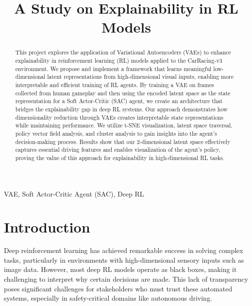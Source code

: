 \documentclass[conference]{IEEEtran}
\begin{document}
\title{A Study on Explainability in RL Models\\
}

\author{
\and
{}
}


\maketitle

\begin{abstract}
This project explores the application of Variational Autoencoders (VAEs) to enhance explainability in reinforcement learning (RL) models applied to the CarRacing-v3 environment. We propose and implement a framework that learns meaningful low-dimensional latent representations from high-dimensional visual inputs, enabling more interpretable and efficient training of RL agents. By training a VAE on frames collected from human gameplay and then using the encoded latent space as the state representation for a Soft Actor-Critic (SAC) agent, we create an architecture that bridges the explainability gap in deep RL systems. Our approach demonstrates how dimensionality reduction through VAEs creates interpretable state representations while maintaining performance. We utilize t-SNE visualization, latent space traversal, policy vector field analysis, and cluster analysis to gain insights into the agent's decision-making process. Results show that our 2-dimensional latent space effectively captures essential driving features and enables visualization of the agent's policy, proving the value of this approach for explainability in high-dimensional RL tasks.
\end{abstract}

\begin{IEEEkeywords}
VAE, Soft Actor-Critic Agent (SAC), Deep RL
\end{IEEEkeywords}

\section{Introduction}
Deep reinforcement learning has achieved remarkable success in solving complex tasks, particularly in environments with high-dimensional sensory inputs such as image data. However, most deep RL models operate as black boxes, making it challenging to interpret why certain decisions are made. This lack of transparency poses significant challenges for stakeholders who must trust these automated systems, especially in safety-critical domains like autonomous driving.
\end{document}
